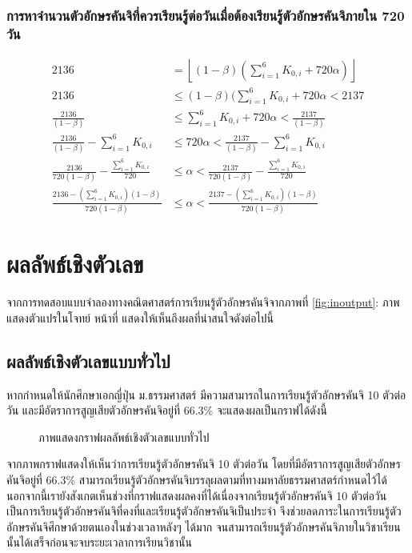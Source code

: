 \documentclass{article}
\begin{document}
\subsubsection{การหาจำนวนตัวอักษรคันจิที่ควรเรียนรู้ต่อวันเมื่อต้องเรียนรู้ตัวอักษรคันจิภายใน 720 วัน}
\begin{align*}
2136 & = \left\lfloor(1 - \beta)(\sum_{i=1}^{6} K_{0,i} + 720\alpha)\right\rfloor\ \\
2136 & \leq (1 - \beta)(\sum_{i=1}^{6} K_{0,i} + 720\alpha < 2137 \\
\frac{2136}{(1 - \beta)} & \leq \sum_{i=1}^{6} K_{0,i} + 720\alpha < \frac{2137}{(1 - \beta)} \\
\frac{2136}{(1 - \beta)} - \sum_{i=1}^{6} K_{0,i} & \leq 720\alpha < \frac{2137}{(1 - \beta)} - \sum_{i=1}^{6} K_{0,i} \\
\frac{2136}{720(1 - \beta)} - \frac{\sum_{i=1}^{6} K_{0,i}}{720} & \leq \alpha < \frac{2137}{720(1 - \beta)} - \frac{\sum_{i=1}^{6} K_{0,i}}{720} \\ 
\frac{2136 - (\sum_{i=1}^{6} K_{0,i})(1 - \beta)}{720(1 - \beta)} & \leq \alpha < \frac{2137 - (\sum_{i=1}^{6} K_{0,i})(1 - \beta)}{720(1 - \beta)}
\end{align*}

\section{ผลลัพธ์เชิงตัวเลข}
จากการทดสอบแบบจำลองทางคณิตศาสตร์การเรียนรู้ตัวอักษรคันจิจากภาพที่ \ref{fig:inoutput}: ภาพแสดงตัวแปรในโจทย์ หน้าที่ \pageref{fig:inoutput} แสดงให้เห็นถึงผลที่น่าสนใจดังต่อไปนี้

\subsection{ผลลัพธ์เชิงตัวเลขแบบทั่วไป}
หากกำหนดให้นักศึกษาเอกญี่ปุ่น ม.ธรรมศาสตร์ มีความสามารถในการเรียนรู้ตัวอักษรคันจิ 10 ตัวต่อวัน และมีอัตราการสูญเสียตัวอักษรคันจิอยู่ที่ 66.3\%\cite{ebbinghaus1913memory} จะแสดงผลเป็นกราฟได้ดังนี้ 

\begin{figure}[h!]
\centering
\caption{ภาพแสดงกราฟผลลัพธ์เชิงตัวเลขแบบทั่วไป}
\label{fig:graph1}
\end{figure}

จากภาพกราฟแสดงให้เห็นว่าการเรียนรู้ตัวอักษรคันจิ 10 ตัวต่อวัน โดยที่มีอัตราการสูญเสียตัวอักษรคันจิอยู่ที่ 66.3\%\cite{ebbinghaus1913memory} สามารถเรียนรู้ตัวอักษรคันจิบรรลุผลตามที่ทางมหาลัยธรรมศาสตร์กำหนดไว้ได้ นอกจากนี้เรายังสังเกตเห็นช่วงที่กราฟแสดงผลคงที่ได้เนื่องจากเรียนรู้ตัวอักษรคันจิ 10 ตัวต่อวัน เป็นการเรียนรู้ตัวอักษรคันจิที่คงที่และเรียนรู้ตัวอักษรคันจิเป็นประจำ จึงช่วยลดภาระในการเรียนรู้ตัวอักษรคันจิศึกษาด้วยตนเองในช่วงเวลาหลังๆ ได้มาก จนสามารถเรียนรู้ตัวอักษรคันจิภายในวิชาเรียนนั้นได้เสร็จก่อนจะจบระยะเวลาการเรียนวิชานั้น
\end{document}
